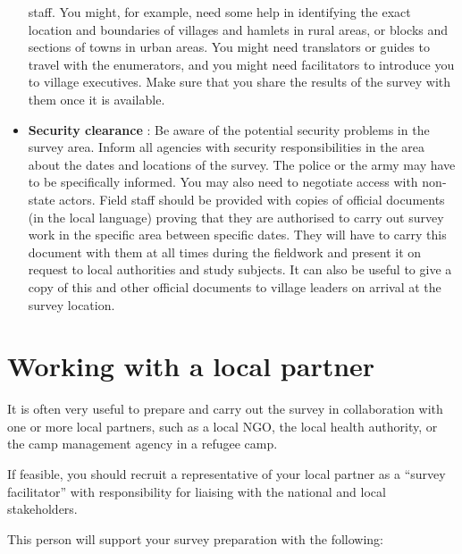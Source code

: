 \documentclass[12pt,a4paper]{book}
\theoremstyle{definition}
\theoremstyle{definition}
\theoremstyle{definition}
\theoremstyle{remark}
\begin{document}
\begin{itemize}
  staff. You might, for example, need some help in identifying the exact
  location and boundaries of villages and hamlets in rural areas, or
  blocks and sections of towns in urban areas. You might need
  translators or guides to travel with the enumerators, and you might
  need facilitators to introduce you to village executives. Make sure
  that you share the results of the survey with them once it is
  available.
\item
  \textbf{Security clearance} : Be aware of the potential security
  problems in the survey area. Inform all agencies with security
  responsibilities in the area about the dates and locations of the
  survey. The police or the army may have to be specifically informed.
  You may also need to negotiate access with non-state actors. Field
  staff should be provided with copies of official documents (in the
  local language) proving that they are authorised to carry out survey
  work in the specific area between specific dates. They will have to
  carry this document with them at all times during the fieldwork and
  present it on request to local authorities and study subjects. It can
  also be useful to give a copy of this and other official documents to
  village leaders on arrival at the survey location.
\end{itemize}

\hypertarget{working-with-a-local-partner}{%
\section{Working with a local
partner}\label{working-with-a-local-partner}}

It is often very useful to prepare and carry out the survey in
collaboration with one or more local partners, such as a local NGO, the
local health authority, or the camp management agency in a refugee camp.

If feasible, you should recruit a representative of your local partner
as a ``survey facilitator'' with responsibility for liaising with the
national and local stakeholders.

This person will support your survey preparation with the following:
\end{document}
